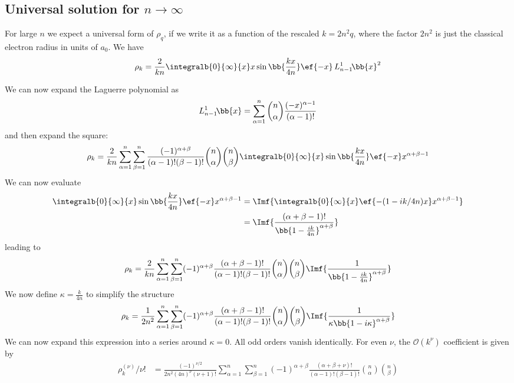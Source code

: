 \subsection{Universal solution for $n\rightarrow\infty$}
For large $n$ we expect a universal form of $\rho_q$, if we write it as a function of the rescaled $k=2n^2 q$, where the factor $2n^2$ is just the classical electron radius in units of $a_0$. We have
\begin{align}
\rho_k = \frac{2}{k n}\integralb{0}{\infty}{x} x \sin\bb{\frac{kx}{4n}} \ef{-x} \, L_{n-1}^1\!\bb{x}^2
\end{align}

We can now expand the Laguerre polynomial as
\begin{align}
L_{n-1}^1\!\bb{x}=\sum_{\alpha=1}^{n} \binom{n}{\alpha} \frac{(-x)^{\alpha-1}}{(\alpha-1)!}
\end{align}
and then expand the square:
\begin{align}
\rho_k=\frac{2}{k n} \sum_{\alpha=1}^{n}\sum_{\beta=1}^{n} \frac{(-1)^{\alpha+\beta}}{(\alpha-1)! (\beta-1)!} \binom{n}{\alpha}\binom{n}{\beta} \integralb{0}{\infty}{x} \sin\bb{\frac{kx}{4n}} \ef{-x} x^{\alpha+\beta-1}
\end{align}
We can now evaluate
\begin{align}
    \integralb{0}{\infty}{x} \sin\bb{\frac{kx}{4n}} \ef{-x} x^{\alpha+\beta-1} &= \Imf{ \integralb{0}{\infty}{x} \ef{-(1-ik /4n)x} x^{\alpha+\beta-1}} \\
    &= \Imf{ \frac{(\alpha+\beta-1)!}{\bb{1-\frac{i k}{4n}}^{\alpha+\beta}} }
\end{align}
leading to
\begin{align}
    \rho_k=\frac{2}{k n} \sum_{\alpha=1}^{n}\sum_{\beta=1}^{n} (-1)^{\alpha+\beta} \frac{(\alpha+\beta-1)!}{(\alpha-1)! (\beta-1)!} \binom{n}{\alpha}\binom{n}{\beta} \Imf{ \frac{1}{\bb{1-\frac{i k}{4n}}^{\alpha+\beta}} }
\end{align}
We now define $\kappa=\frac{k}{4n}$ to simplify the structure
\begin{align}
    \rho_k=\frac{1}{2n^2} \sum_{\alpha=1}^{n}\sum_{\beta=1}^{n} (-1)^{\alpha+\beta} \frac{(\alpha+\beta-1)!}{(\alpha-1)! (\beta-1)!} \binom{n}{\alpha}\binom{n}{\beta} \Imf{ \frac{1}{\kappa\bb{ 1-i\kappa }^{\alpha+\beta}} }
\end{align}
We can now expand this expression into a series around $\kappa=0$. All odd orders vanish identically. For even $\nu$, the $\mathcal{O}(k^\nu)$ coefficient is given by
\begin{align}
\rho^{(\nu)}_k/\nu! &=\frac{(-1)^{\nu/2}}{2n^2 (4n)^\nu (\nu+1)!} \sum_{\alpha=1}^{n}\sum_{\beta=1}^{n} (-1)^{\alpha+\beta} \frac{(\alpha+\beta+\nu)!}{(\alpha-1)! (\beta-1)!} \binom{n}{\alpha}\binom{n}{\beta}
\end{align}
